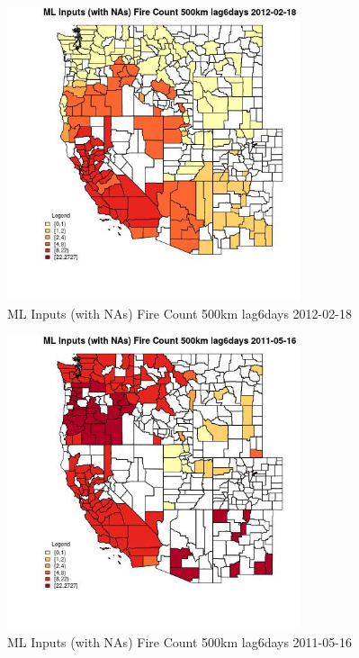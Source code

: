 \begin{figure} 
\centering  
\includegraphics[width=0.77\textwidth]{Code_Outputs/Report_ML_input_PM25_Step4_part_f_de_duplicated_aves_prioritize_24hr_obswNAs_CountyFire_Count_500km_lag6daysMean2012-02-18.jpg} 
\caption{\label{fig:Report_ML_input_PM25_Step4_part_f_de_duplicated_aves_prioritize_24hr_obswNAsCountyFire_Count_500km_lag6daysMean2012-02-18}ML Inputs (with NAs) Fire Count 500km lag6days 2012-02-18} 
\end{figure} 
 

\begin{figure} 
\centering  
\includegraphics[width=0.77\textwidth]{Code_Outputs/Report_ML_input_PM25_Step4_part_f_de_duplicated_aves_prioritize_24hr_obswNAs_CountyFire_Count_500km_lag6daysMean2011-05-16.jpg} 
\caption{\label{fig:Report_ML_input_PM25_Step4_part_f_de_duplicated_aves_prioritize_24hr_obswNAsCountyFire_Count_500km_lag6daysMean2011-05-16}ML Inputs (with NAs) Fire Count 500km lag6days 2011-05-16} 
\end{figure} 
 

